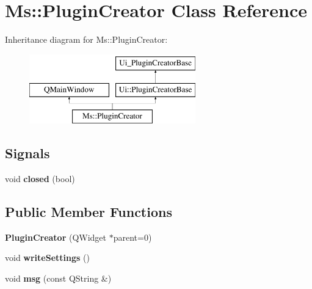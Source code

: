 \hypertarget{class_ms_1_1_plugin_creator}{}\section{Ms\+:\+:Plugin\+Creator Class Reference}
\label{class_ms_1_1_plugin_creator}
Inheritance diagram for Ms\+:\+:Plugin\+Creator\+:\begin{figure}[H]
\begin{center}
\leavevmode
\includegraphics[height=3.000000cm]{class_ms_1_1_plugin_creator}
\end{center}
\end{figure}
\subsection*{Signals}
\begin{DoxyCompactItemize}
\item 
\mbox{\label{class_ms_1_1_plugin_creator_a5a77959ac576d30ecd40d4a1ba52b3c0}} 
void {\bfseries closed} (bool)
\end{DoxyCompactItemize}
\subsection*{Public Member Functions}
\begin{DoxyCompactItemize}
\item 
\mbox{\label{class_ms_1_1_plugin_creator_a5cdad69c1aa3b266bf5d7b10095aa673}} 
{\bfseries Plugin\+Creator} (Q\+Widget $\ast$parent=0)
\item 
\mbox{\label{class_ms_1_1_plugin_creator_a9ce44a74dea57fa9aa08850cfcec57f5}} 
void {\bfseries write\+Settings} ()
\item 
\mbox{\label{class_ms_1_1_plugin_creator_a781d8be51ce2f27921bb8fa740495a67}} 
void {\bfseries msg} (const Q\+String \&)
\end{DoxyCompactItemize}
